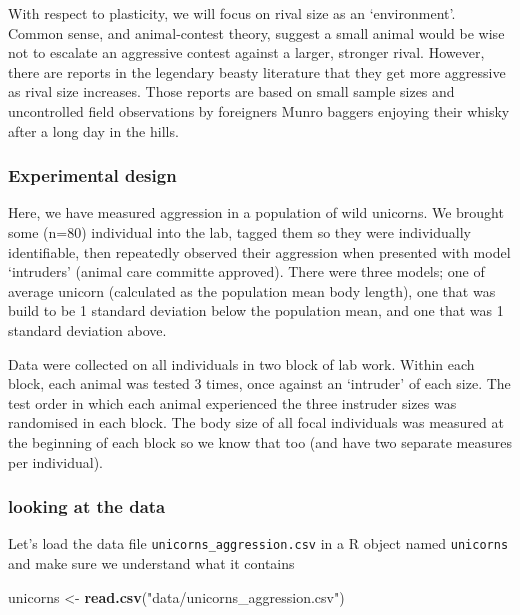 \documentclass[
  12pt,
]{book}
\newenvironment{Shaded}{\begin{snugshade}}{\end{snugshade}}
\newcommand{\KeywordTok}[1]{\textcolor[rgb]{0.13,0.29,0.53}{\textbf{#1}}}
\newcommand{\NormalTok}[1]{#1}
\newcommand{\StringTok}[1]{\textcolor[rgb]{0.31,0.60,0.02}{#1}}
\begin{document}
With respect to plasticity, we will focus on rival size as an `environment'. Common sense, and animal-contest theory, suggest a small animal would be wise not to escalate an aggressive contest against a larger, stronger rival. However, there are reports in the legendary beasty literature that they get more aggressive as rival size increases. Those reports are based on small sample sizes and uncontrolled field observations by foreigners Munro baggers enjoying their whisky after a long day in the hills.

\hypertarget{experimental-design}{%
\subsubsection{Experimental design}\label{experimental-design}}

Here, we have measured aggression in a population of wild unicorns. We brought some (n=80) individual into the lab, tagged them so they were individually identifiable, then repeatedly observed their aggression when presented with model `intruders' (animal care committe approved). There were three models; one of average unicorn (calculated as the population mean body length), one that was build to be 1 standard deviation below the population mean, and one that was 1 standard deviation above.

Data were collected on all individuals in two block of lab work. Within each block, each animal was tested 3 times, once against an `intruder' of each size. The test order in which each animal experienced the three instruder sizes was randomised in each block. The body size of all focal individuals was measured at the beginning of each block so we know that too (and have two separate measures per individual).

\hypertarget{looking-at-the-data}{%
\subsubsection{looking at the data}\label{looking-at-the-data}}

Let's load the data file \texttt{unicorns\_aggression.csv} in a R object named \texttt{unicorns} and make sure we understand what it contains

\begin{Shaded}
\begin{Highlighting}[]
\NormalTok{unicorns \textless{}{-}}\StringTok{ }\KeywordTok{read.csv}\NormalTok{(}\StringTok{"data/unicorns\_aggression.csv"}\NormalTok{)}
\end{Highlighting}
\end{Shaded}
\end{document}
